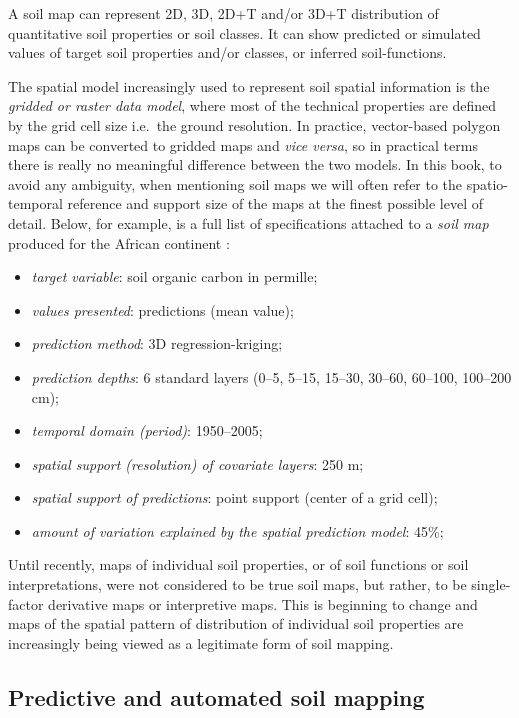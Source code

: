 \documentclass[graybox,natbib,nospthms,UStrade]{svmono}
\let\BeginKnitrBlock\begin \let\EndKnitrBlock\end
\let\BeginKnitrBlock\begin \let\EndKnitrBlock\end
\begin{document}
\BeginKnitrBlock{rmdnote}
A soil map can represent 2D, 3D, 2D+T
and/or 3D+T distribution of quantitative soil properties or soil
classes. It can show predicted or simulated values of target soil
properties and/or classes, or inferred soil-functions.
\EndKnitrBlock{rmdnote}

The spatial model increasingly used to represent soil spatial
information is the \emph{gridded or raster data model}, where most of the
technical properties are defined by the grid cell size i.e.~the ground
resolution. In practice,
vector-based polygon maps can be converted to gridded maps and \emph{vice
versa}, so in practical terms there is really no meaningful difference
between the two models. In this book, to avoid any ambiguity, when
mentioning soil maps we will often refer to the spatio-temporal
reference and support size of the maps at the finest possible level of
detail. Below, for example, is a full list of specifications attached to
a \emph{soil map} produced for the African continent \citep{Hengl2015AfSoilGrids250m}:

\begin{itemize}
\item
  \emph{target variable}: soil organic carbon in permille;
\item
  \emph{values presented}: predictions (mean value);
\item
  \emph{prediction method}: 3D regression-kriging;
\item
  \emph{prediction depths}: 6 standard layers (0--5, 5--15, 15--30, 30--60,
  60--100, 100--200 cm);
\item
  \emph{temporal domain (period)}: 1950--2005;
\item
  \emph{spatial support (resolution) of covariate layers}: 250 m;
\item
  \emph{spatial support of predictions}: point support (center of a grid
  cell);
\item
  \emph{amount of variation explained by the spatial prediction model}: 45\%;
\end{itemize}

Until recently, maps of individual soil properties, or of soil functions
or soil interpretations, were not considered to be true soil maps, but
rather, to be single-factor derivative maps or interpretive maps. This
is beginning to change and maps of the spatial pattern of distribution
of individual soil properties are increasingly being viewed as a
legitimate form of soil mapping.

\hypertarget{pedometric-mapping}{%
\subsection{Predictive and automated soil mapping}\label{pedometric-mapping}}
\end{document}
